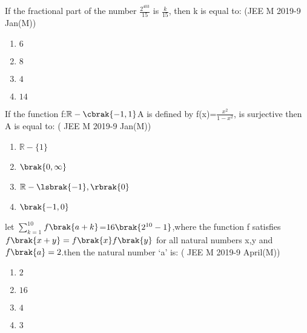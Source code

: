 
\iffalse
  \title{Functions}
  \author{Malakala bala subrahmanya aravind}
  \section{mcq-single}
\fi

\item If the fractional part of the number $\frac{2^{403}}{15}$ is $\frac{k}{15}$, then k is equal to:
    \hfill {(JEE M 2019-9 Jan(M))} 
\begin{enumerate}
    \item $6$
    \item $8$
    \item $4$
    \item $14$
\end{enumerate} 
\item If the function f:$\mathbb{R}-\cbrak{-1,1}$A is defined by f(x)=$\frac{x^2}{1-x^2}$, is surjective then A is equal to:
   \hfill {( JEE M 2019-9 Jan(M))}
\begin{enumerate}
    \item $\mathbb{R}-\{1\}$
    \item $\brak{0,\infty}$
    \item $\mathbb{R}-\lsbrak{-1},\rbrak{0}$
    \item $\brak{-1,0}$
\end{enumerate}
  \item let $\sum\limits_{k=1}^{10}$$f\brak{a+k}$=$16\brak{2^{10}-1}$,where the function f satisfies $f\brak{x+y}=f\brak{x}f\brak{y}$ for all natural numbers x,y and $f\brak{a}=2$.then the natural number `a' is:
    \hfill {( JEE M 2019-9 April(M))} 
\begin{enumerate}
    \item $2$
    \item $16$
    \item $4$
    \item $3$   
\end{enumerate}
    

